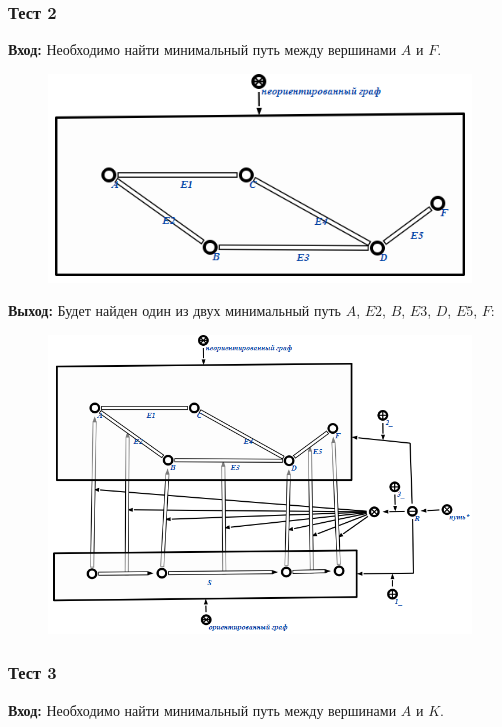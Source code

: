 \newpage

\subsubsection{Тест 2}
\textbf{Вход:}
Необходимо найти минимальный путь между вершинами $A$ и $F$.

\begin{figure}[h!]
  \centering
  \includegraphics[scale=0.7]{images/2/test/2_In}
  \label{fig:Test2_In}
\end{figure}

\textbf{Выход:}
Будет найден один из двух минимальный путь $A$, $E2$, $B$, $E3$, $D$, $E5$, $F$:

\begin{figure}[h!]
  \centering
  \includegraphics[scale=0.7]{images/2/test/2_Out}
  \label{fig:Test2_Out}
\end{figure}

\newpage

\subsubsection{Тест 3}
\textbf{Вход:}
Необходимо найти минимальный путь между вершинами $A$ и $K$. 

